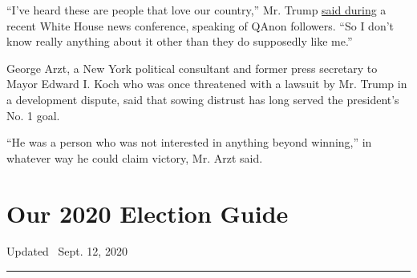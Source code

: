 ``I've heard these are people that love our country,'' Mr. Trump
\href{https://www.nytimes3xbfgragh.onion/2020/08/19/us/politics/trump-qanon-conspiracy-theories.html}{said
during} a recent White House news conference, speaking of QAnon
followers. ``So I don't know really anything about it other than they do
supposedly like me.''

George Arzt, a New York political consultant and former press secretary
to Mayor Edward I. Koch who was once threatened with a lawsuit by Mr.
Trump in a development dispute, said that sowing distrust has long
served the president's No. 1 goal.

``He was a person who was not interested in anything beyond winning,''
in whatever way he could claim victory, Mr. Arzt said.

\hypertarget{our-2020-election-guide}{%
\section{Our 2020 Election Guide}\label{our-2020-election-guide}}

Updated ~Sept. 12, 2020

\begin{center}\rule{0.5\linewidth}{\linethickness}\end{center}

